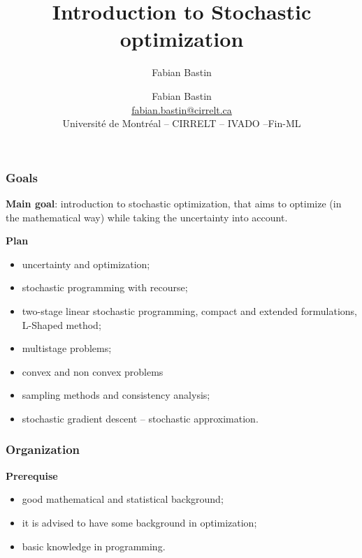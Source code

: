 \documentclass{beamer}
\title[Plan]{Introduction to Stochastic optimization}
\author{Fabian Bastin}
\author[Fabian Bastin]{Fabian Bastin \\ \url{fabian.bastin@cirrelt.ca} \\ Université de Montréal -- CIRRELT -- IVADO --Fin-ML}
\begin{document}
\frame{\titlepage}

\begin{frame}
\frametitle{Goals}


{\bf Main goal}: introduction to stochastic optimization, that aims to optimize (in the mathematical way) while taking the uncertainty into account.

\mbox{}

{\bf Plan}
\begin{itemize}
\item
uncertainty and optimization;
\item
stochastic programming with recourse;
\item
two-stage linear stochastic programming, compact and extended formulations, L-Shaped method;
\item
multistage problems;
\item
convex and non convex problems
\item
sampling methods and consistency analysis;
\item
stochastic gradient descent -- stochastic approximation.
\end{itemize}

\end{frame}

\begin{frame}
\frametitle{Organization}

{\bf Prerequise}
\begin{itemize}
\item
good mathematical and statistical background;
\item
it is advised to have some background in optimization;
\item
basic knowledge in programming.
\end{itemize}

\end{frame}
\end{document}
